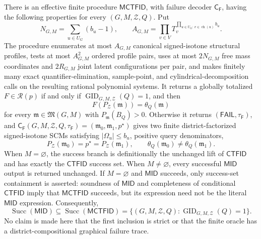 There is an effective finite procedure \(\mathsf{MCTFID}\), with failure decoder \(\mathsf C_{\mathsf F}\), having the following properties for every \((G,M,\mathcal Z,Q)\).  Put
\[
 N_{G,M}=\sum_{u\in U_G}(b_u-1),
 \qquad
 A_{G,M}=\prod_{v\in V}T_v^{\prod_{u\in U_G:\,v\in\operatorname{ch}(u)}b_u}.
\]
The procedure enumerates at most \(A_{G,M}\) canonical signed-isotone structural profiles, tests at most \(A_{G,M}^2\) ordered profile pairs, uses at most \(2N_{G,M}\) free mass coordinates and \(2R_{G,M}\) joint latent configurations per pair, and makes finitely many exact quantifier-elimination, sample-point, and cylindrical-decomposition calls on the resulting rational polynomial systems.  It returns a globally totalized \(F\in\mathcal R(p)\) if and only if \(\operatorname{GID}_{G,M,\mathcal Z}(Q)=1\), and then
\[
 F(P_{\mathcal Z}(\mathfrak m))=\theta_Q(\mathfrak m)
\]
for every \(\mathfrak m\in\mathfrak M(G,M)\) with \(P_{\mathfrak m}(B_Q)>0\).  Otherwise it returns \((\mathsf{FAIL},\tau_{\mathsf F})\), and \(\mathsf C_{\mathsf F}(G,M,\mathcal Z,Q,\tau_{\mathsf F})=(\mathfrak m_0,\mathfrak m_1,p^{\star})\) gives two finite district-factorized signed-isotone SCMs satisfying \(|\Omega_u|\le b_u\), positive query denominators,
\[
 P_{\mathcal Z}(\mathfrak m_0)=p^{\star}=P_{\mathcal Z}(\mathfrak m_1),
 \qquad
 \theta_Q(\mathfrak m_0)\ne\theta_Q(\mathfrak m_1).
\]
When \(M=\varnothing\), the success branch is definitionally the unchanged lift of \(\mathsf{CTFID}\) and has exactly the \(\mathsf{CTFID}\) success set.  When \(M\ne\varnothing\), every successful \(\mathsf{MID}\) output is returned unchanged.  If \(M=\varnothing\) and \(\mathsf{MID}\) succeeds, only success-set containment is asserted: soundness of \(\mathsf{MID}\) and completeness of conditional \(\mathsf{CTFID}\) imply that \(\mathsf{MCTFID}\) succeeds, but its expression need not be the literal \(\mathsf{MID}\) expression.  Consequently,
\[
 \operatorname{Succ}(\mathsf{MID})
 \subseteq\operatorname{Succ}(\mathsf{MCTFID})
 =\{(G,M,\mathcal Z,Q):\operatorname{GID}_{G,M,\mathcal Z}(Q)=1\}.
\]
No claim is made here that the first inclusion is strict or that the finite oracle has a district-compositional graphical failure trace.